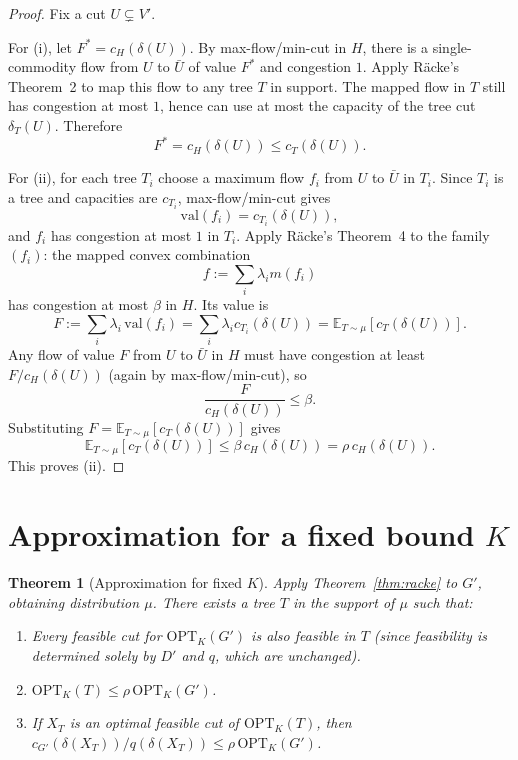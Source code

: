\documentclass[11pt]{article}
\newtheorem{theorem}{Theorem}
\newcommand{\cut}{\delta}
\newcommand{\OPT}{\mathrm{OPT}}
\newcommand{\Etree}{\mathbb{E}_{T\sim\mu}}
\begin{document}
\begin{proof}
Fix a cut $U\subsetneq V'$.

For (i), let $F^*=c_H(\cut(U))$. By max-flow/min-cut in $H$, there is a
single-commodity flow from $U$ to $\bar U$ of value $F^*$ and congestion $1$.
Apply Räcke's Theorem~2 to map this flow to any tree $T$ in support. The mapped
flow in $T$ still has congestion at most $1$, hence can use at most the capacity
of the tree cut $\cut_T(U)$. Therefore
\[
  F^*=c_H(\cut(U))\le c_T(\cut(U)).
\]

For (ii), for each tree $T_i$ choose a maximum flow $f_i$ from $U$ to $\bar U$ in $T_i$.
Since $T_i$ is a tree and capacities are $c_{T_i}$, max-flow/min-cut gives
\[
  \mathrm{val}(f_i)=c_{T_i}(\cut(U)),
\]
and $f_i$ has congestion at most $1$ in $T_i$.
Apply Räcke's Theorem~4 to the family $(f_i)$: the mapped convex combination
\[
  f:=\sum_i \lambda_i m(f_i)
\]
has congestion at most $\beta$ in $H$. Its value is
\[
  F:=\sum_i \lambda_i\,\mathrm{val}(f_i)
   =\sum_i\lambda_i c_{T_i}(\cut(U))
   =\Etree[c_T(\cut(U))].
\]
Any flow of value $F$ from $U$ to $\bar U$ in $H$ must have congestion at least
$F/c_H(\cut(U))$ (again by max-flow/min-cut), so
\[
  \frac{F}{c_H(\cut(U))}\le \beta.
\]
Substituting $F=\Etree[c_T(\cut(U))]$ gives
\[
  \Etree[c_T(\cut(U))]\le \beta\,c_H(\cut(U))=\rho\,c_H(\cut(U)).
\]
This proves (ii).
\end{proof}




\section{Approximation for a fixed bound $K$}

\begin{theorem}[Approximation for fixed $K$]\label{thm:fixed-K}
  Apply Theorem~\ref{thm:racke} to $G'$, obtaining distribution $\mu$.
  There exists a tree $T$ in the support of $\mu$ such that:
  \begin{enumerate}
    \item[(a)] Every feasible cut for $\OPT_K(G')$ is also feasible in $T$
      (since feasibility is determined solely by $D'$ and $q$, which are unchanged).
    \item[(b)] $\OPT_K(T)\le \rho\,\OPT_K(G')$.
    \item[(c)] If $X_T$ is an optimal feasible cut of $\OPT_K(T)$, then
      $c_{G'}(\cut(X_T))/q(\cut(X_T))\le \rho\,\OPT_K(G')$.
  \end{enumerate}
\end{theorem}
\end{document}
